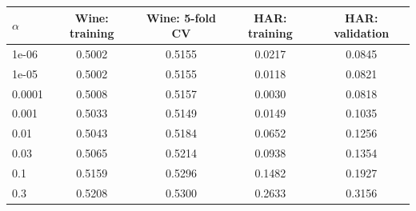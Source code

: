 \begin{tabular}{lcccc}
\toprule
$\alpha$ & Wine: training & Wine: 5-fold CV & HAR: training & HAR: validation \\
\midrule
1e-06 & 0.5002 & 0.5155 & 0.0217 & 0.0845 \\
1e-05 & 0.5002 & 0.5155 & 0.0118 & 0.0821 \\
0.0001 & 0.5008 & 0.5157 & 0.0030 & 0.0818 \\
0.001 & 0.5033 & 0.5149 & 0.0149 & 0.1035 \\
0.01 & 0.5043 & 0.5184 & 0.0652 & 0.1256 \\
0.03 & 0.5065 & 0.5214 & 0.0938 & 0.1354 \\
0.1 & 0.5159 & 0.5296 & 0.1482 & 0.1927 \\
0.3 & 0.5208 & 0.5300 & 0.2633 & 0.3156 \\
\bottomrule
\end{tabular}
